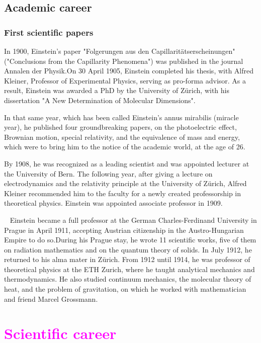 \documentclass{article}
\begin{document}
\subsection{Academic career}
\subsubsection{First scientific papers}
In 1900, Einstein's paper "Folgerungen aus den Capillaritätserscheinungen" ("Conclusions from the Capillarity Phenomena") was published in the journal Annalen der Physik.On 30 April 1905, Einstein completed his thesis, with Alfred Kleiner, Professor of Experimental Physics, serving as pro-forma advisor. As a result, Einstein was awarded a PhD by the University of Zürich, with his dissertation "A New Determination of Molecular Dimensions".

In that same year, which has been called Einstein's annus mirabilis (miracle year), he published four groundbreaking papers, on the photoelectric effect, Brownian motion, special relativity, and the equivalence of mass and energy, which were to bring him to the notice of the academic world, at the age of 26.

\begin{flushleft}
By 1908, he was recognized as a leading scientist and was appointed lecturer at the University of Bern. The following year, after giving a lecture on electrodynamics and the relativity principle at the University of Zürich, Alfred Kleiner recommended him to the faculty for a newly created professorship in theoretical physics. Einstein was appointed associate professor in 1909.

~\newline
Einstein became a full professor at the German Charles-Ferdinand University in Prague in April 1911, accepting Austrian citizenship in the Austro-Hungarian Empire to do so.During his Prague stay, he wrote 11 scientific works, five of them on radiation mathematics and on the quantum theory of solids. In July 1912, he returned to his alma mater in Zürich. From 1912 until 1914, he was professor of theoretical physics at the ETH Zurich, where he taught analytical mechanics and thermodynamics. He also studied continuum mechanics, the molecular theory of heat, and the problem of gravitation, on which he worked with mathematician and friend Marcel Grossmann.
\end{flushleft}




\newpage
\section{\textcolor{magenta}{Scientific career}}
\end{document}
